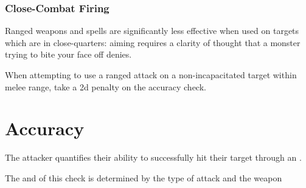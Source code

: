 \subsubsection{Close-Combat Firing}

Ranged weapons and spells are significantly less effective when used on targets which are in close-quarters: aiming requires a clarity of thought that a monster trying to bite your face off denies. 

When attempting to use a ranged attack on a non-incapacitated target within melee range, take a 2d penalty on the accuracy check.

\section{Accuracy}

The attacker quantifies their ability to successfully hit their target through an . 

The  and  of this check is determined by the type of attack and the weapon 










